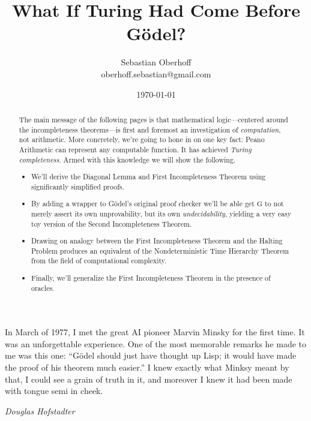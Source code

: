 \documentclass{article}
\theoremstyle{customstyle}
\begin{document}
\title{\vspace{-1cm}What If Turing Had Come Before Gödel?}
\author{Sebastian Oberhoff\\{\small oberhoff.sebastian@gmail.com}}
\date{\today}

\maketitle

\begin{abstract}
The main message of the following pages is that mathematical logic---centered around the incompleteness theorems---is first and foremost an investigation of \emph{computation}, not arithmetic. More concretely, we're going to hone in on one key fact: Peano Arithmetic can represent any computable function. It has achieved \emph{Turing completeness}. Armed with this knowledge we will show the following.
\begin{itemize}
\item We'll derive the Diagonal Lemma and First Incompleteness Theorem using significantly simplified proofs.
\item By adding a wrapper to Gödel's original proof checker we'll be able get $\mathrm{G}$ to not merely assert its own unprovability, but its own \emph{undecidability}, yielding a very easy toy version of the Second Incompleteness Theorem.
\item Drawing on analogy between the First Incompleteness Theorem and the Halting Problem produces an equivalent of the Nondeterministic Time Hierarchy Theorem from the field of computational complexity.
\item Finally, we'll generalize the First Incompleteness Theorem in the presence of oracles.
\end{itemize}
\end{abstract}

\epigraph{In March of 1977, I met the great AI pioneer Marvin Minsky for the first time. It was an unforgettable experience. One of the most memorable remarks he made to me was this one: ``Gödel should just have thought up Lisp; it would have made the proof of his theorem much easier.'' I knew exactly what Minksy meant by that, I could see a grain of truth in it, and moreover I knew it had been made with tongue semi in cheek.}{\textit{Douglas Hofstadter}}
\end{document}
